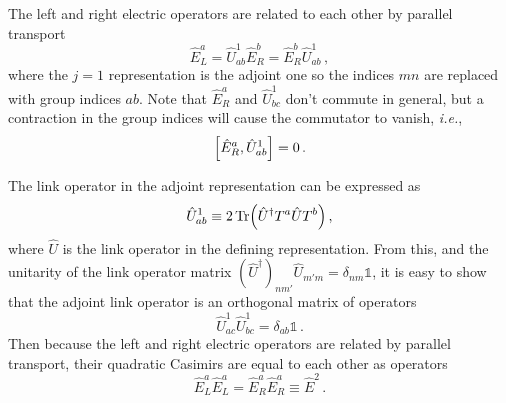 \documentclass[reprint,superscriptaddress,pra,nofootinbib,preprintnumbers,floatfix]{revtex4-1}
\providecommand{\ie}{\emph{i.e.}}
\begin{document}
The left and right electric operators are related to each other by parallel transport
%
\begin{equation}
    \hat{E}_L^a = \hat{U}^{1}_{ab} \hat{E}_R^b =  \hat{E}_R^b \hat{U}^{1}_{ab} \,,
\end{equation}
%
where the $j=1$ representation is the adjoint one so the indices $mn$ are replaced with group indices $ab$. 
%
Note that $\hat{E}^a_R$ and $\hat{U}^1_{bc}$ don't commute in general, but a contraction in the group indices will cause the commutator to vanish, \ie,
%
\begin{equation}
  \comm{\hat E^a_R}{\hat U^1_{ab}} = 0 \,.
\end{equation}

The link operator in the adjoint representation can be expressed as
%
\begin{equation}\label{eq:adjoing_def}
    \hat{U}^1_{ab} \equiv 2\Tr( \hat{U}^\dagger T^a \hat{U} T^b ) \,,
\end{equation}
%
where $\hat{U}$ is the link operator in the defining representation. 
%
From this, and the unitarity of the link operator matrix $(\hat{U}^\dagger)_{nm'} \hat{U}_{m'm} = \delta_{nm} \mathds{1}$, it is easy to show that the adjoint link operator is an orthogonal matrix of operators
%
\begin{equation}
    \hat{U}^{1}_{ac} \hat{U}^1_{bc} = \delta_{ab}\mathds{1} \,.
\end{equation}
%
Then because the left and right electric operators are related by parallel transport, their quadratic Casimirs are equal to each other as operators
%
\begin{equation}\label{eq:Casimir}
    \hat{E}^a_L \hat{E}^a_L = \hat{E}^a_R \hat{E}^a_R \equiv \hat{E}^2 \,.
\end{equation}
\end{document}
